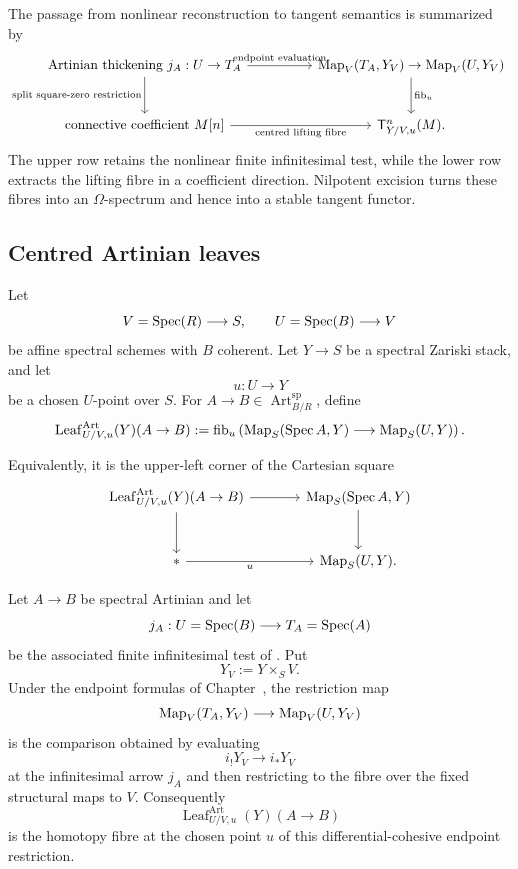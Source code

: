 The passage from nonlinear reconstruction to tangent semantics is summarized by
\[
\begin{tikzcd}[column sep=huge,row sep=large]
    \text{Artinian thickening }j_A:U\to T_A
        \arrow[r,"\text{endpoint evaluation}"]
        \arrow[d,"\text{split square-zero restriction}"']
    &
    \Map_V(T_A,Y_V)\to\Map_V(U,Y_V)
        \arrow[d,"\operatorname{fib}_u"]
    \\
    \text{connective coefficient }M[n]
        \arrow[r,"\text{centred lifting fibre}"']
    &
    \mathsf T^n_{Y/V,u}(M).
\end{tikzcd}
\]
The upper row retains the nonlinear finite infinitesimal test, while the lower row
extracts the lifting fibre in a coefficient direction. Nilpotent excision turns these
fibres into an \(\Omega\)-spectrum and hence into a stable tangent functor.

\subsection{Centred Artinian leaves}

\begin{definition}
\label{def:centred-artinian-leaf}
Let
\[
    V=\operatorname{Spec}(R)\longrightarrow S,
    \qquad
    U=\operatorname{Spec}(B)\longrightarrow V
\]
be affine spectral schemes with \(B\) coherent. Let \(Y\to S\) be a spectral
Zariski stack, and let
\[
    u:U\longrightarrow Y
\]
be a chosen \(U\)-point over \(S\). For
\(A\to B\in\operatorname{Art}^{\mathrm{sp}}_{B/R}\), define
\[
    \operatorname{Leaf}^{\mathrm{Art}}_{U/V,u}(Y)(A\to B)
    :=
    \operatorname{fib}_u
    \left(
        \operatorname{Map}_S(\operatorname{Spec} A,Y)
        \longrightarrow
        \operatorname{Map}_S(U,Y)
    \right).
\]

Equivalently, it is the upper-left corner of the Cartesian square
\[
\begin{tikzcd}[column sep=large,row sep=large]
    \operatorname{Leaf}^{\mathrm{Art}}_{U/V,u}(Y)(A\to B)
        \arrow[r] \arrow[d]
        &
    \Map_S(\Spec A,Y) \arrow[d]
    \\
    * \arrow[r,"u"']
        & \Map_S(U,Y).
\end{tikzcd}
\]
\end{definition}

\begin{proposition}
\label{prop:artinian-leaf-endpoint-fibre}
Let \(A\to B\) be spectral Artinian and let
\[
    j_A:
    U=\operatorname{Spec}(B)\longrightarrow T_A=\operatorname{Spec}(A)
\]
be the associated finite infinitesimal test of
. Put
\[
    Y_V:=Y\times_SV.
\]
Under the endpoint formulas of
Chapter~, the restriction map
\[
    \operatorname{Map}_V(T_A,Y_V)
    \longrightarrow
    \operatorname{Map}_V(U,Y_V)
\]
is the comparison obtained by evaluating
\[
    i_!Y_V\longrightarrow i_*Y_V
\]
at the infinitesimal arrow \(j_A\) and then restricting to the fibre over the
fixed structural maps to \(V\). Consequently
\[
    \operatorname{Leaf}^{\mathrm{Art}}_{U/V,u}(Y)(A\to B)
\]
is the homotopy fibre at the chosen point \(u\) of this differential-cohesive endpoint
restriction.
\end{proposition}

